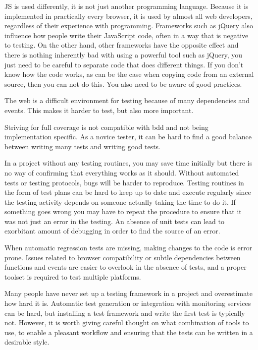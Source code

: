 \documentclass[11pt]{article}
\begin{document}
JS is used differently, it is not just another programming language. Because it is implemented in practically every browser, it is used by almost all web developers, regardless of their experience with programming. Frameworks such as jQuery also influence how people write their JavaScript code, often in a way that is negative to testing. On the other hand, other frameworks have the opposite effect and there is nothing inherently bad with using a powerful tool such as jQuery, you just need to be careful to separate code that does different things. If you don't know how the code works, as can be the case when copying code from an external source, then you can not do this. You also need to be aware of good practices.

The web is a difficult environment for testing because of many dependencies and events. This makes it harder to test, but also more important.

Striving for full coverage is not compatible with \gls{bdd} and not being implementation specific. As a novice tester, it can be hard to find a good balance between writing many tests and writing good tests.

In a project without any testing routines, you may save time initially but there is no way of confirming that everything works as it should. Without automated tests or testing protocols, bugs will be harder to reproduce. Testing routines in the form of test plans can be hard to keep up to date and execute regularly since the testing activity depends on someone actually taking the time to do it. If something goes wrong you may have to repeat the procedure to ensure that it was not just an error in the testing. An absence of unit tests can lead to exorbitant amount of debugging in order to find the source of an error.

When automatic regression tests are missing, making changes to the code is error prone. Issues related to browser compatibility or subtle dependencies between functions and events are easier to overlook in the absence of tests, and a proper toolset is required to test multiple platforms.

Many people have never set up a testing framework in a project and overestimate how hard it is. Automatic test generation or integration with monitoring services can be hard, but installing a test framework and write the first test is typically not. However, it is worth giving careful thought on what combination of tools to use, to enable a pleasant workflow and ensuring that the tests can be written in a desirable style.
\end{document}

